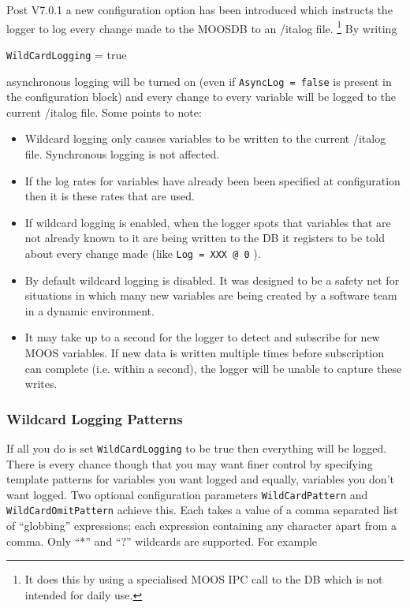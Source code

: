 \documentclass[a4paper,10pt]{article}
\newcommand{\Code}[1]{\texttt{#1} }
\newcommand{\code}[1]{\Code{#1} }
\begin{document}
Post V7.0.1 a new configuration option has been introduced which instructs the logger to log every change made to the MOOSDB to an {/it{alog}} file. \footnote{It does this by using a specialised MOOS IPC call to the DB which is not intended for daily use.} By writing

\begin{center}
\code{WildCardLogging} =  true
\end{center}

asynchronous logging will be turned on (even if \code{AsyncLog = false} is present in the configuration block) and every change to every variable will be logged to the current {/it{alog}} file. Some points to note:

\begin{itemize}
\item Wildcard logging only causes variables to be written to the current {/it{alog}} file. Synchronous logging is not affected.
\item If the log rates for variables have already been been specified at configuration then it is these rates that are used.
\item If wildcard logging is enabled, when the logger spots that variables that are not already known to it are being written to the DB it registers to be told about every change made (like \code{Log = XXX @ 0}).
\item By default wildcard logging is disabled. It was designed to be a safety net for situations in which many new variables are being created by a software team in a dynamic environment.
\item It may take up to a second for the logger to detect and subscribe for new MOOS variables. If new data is written multiple times before subscription can complete (i.e. within a second), the logger will be unable to capture these writes.
\end{itemize}


\subsubsection{Wildcard Logging Patterns}

If all you do is set \code{WildCardLogging} to be true then everything will be logged. There is every chance though that you may want finer control by specifying template patterns for variables you want logged and equally, variables you don't want logged. Two optional configuration parameters \code{WildCardPattern} and \code{WildCardOmitPattern} achieve this. Each takes a value of a comma separated list of  ``globbing'' expressions; each expression containing any character apart from a comma. Only ``*'' and ``?'' wildcards are supported. For example
\end{document}
